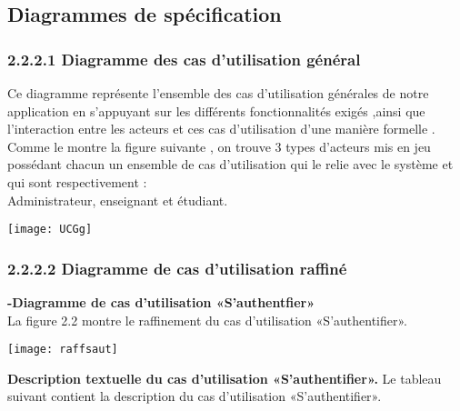 \documentclass[a4paper,12pt,oneside]{report}
\begin{document}
 \subsection{Diagrammes de spécification}
  
  \subsubsection{ 2.2.2.1 Diagramme des cas d'utilisation général}
  Ce diagramme représente l'ensemble des cas d'utilisation générales de notre application en s'appuyant sur les différents fonctionnalités exigés ,ainsi que l'interaction entre les acteurs et ces cas d'utilisation d'une manière formelle . \\
  Comme le montre la figure suivante , on trouve 3 types d'acteurs  mis en jeu possédant  chacun un ensemble de cas d'utilisation qui le relie avec le système et qui sont respectivement :\\
Administrateur, enseignant et étudiant.  
  \begin{center}
\texttt{[image: UCGg]}

\label{fig1}
\end{center}
  \subsubsection{ 2.2.2.2 Diagramme de cas d'utilisation raffiné }
  \textbf{-Diagramme de cas d'utilisation  «S'authentfier»} \\
  La figure 2.2 montre le raffinement du cas d'utilisation «S'authentifier».
  
\begin{center}
\texttt{[image: raffsaut]}
\label{fig1}
\end{center}
\textbf{
Description textuelle du cas d’utilisation «S’authentifier».} 
\newline
\newline
Le tableau suivant contient la description  du cas d’utilisation «S’authentifier». \\
\end{document}
